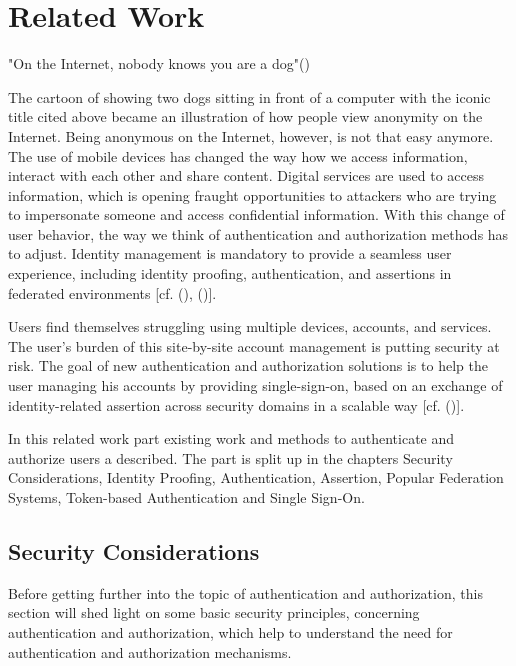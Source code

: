 \chapter{Related Work}\label{chap:authenticationandauthorization}

\chapterstart


"On the Internet, nobody knows you are a dog"(\cite{Steiner:Dog:1992})

The cartoon of \cite{Steiner:Dog:1992} showing two dogs sitting in front of a computer with the iconic title cited above became an illustration of how people view anonymity on the Internet. Being anonymous on the Internet, however, is not that easy anymore. The use of mobile devices has changed the way how we access information, interact with each other and share content. Digital services are used to access information, which is opening fraught opportunities to attackers who are trying to impersonate someone and access confidential information.  With this change of user behavior, the way we think of authentication and authorization methods has to adjust. Identity management is mandatory to provide a seamless user experience, including identity proofing, authentication, and assertions in federated environments [cf. (\cite{NIST:2017:DIG}), (\cite{Corre:2017:WHI})].


Users find themselves struggling using multiple devices, accounts, and services. The user's burden of this site-by-site account management is putting security at risk. The goal of new authentication and authorization solutions is to help the user managing his accounts by providing single-sign-on, based on an exchange of identity-related assertion across security domains in a scalable way [cf. (\cite{Corre:2017:WHI})].  

In this related work part existing work and methods to authenticate and authorize users a described. The part is split up in the chapters Security Considerations, Identity Proofing, Authentication, Assertion, Popular Federation Systems, Token-based Authentication and Single Sign-On.
  

\section{Security Considerations}

Before getting further into the topic of authentication and authorization, this section will shed light on some basic security principles, concerning authentication and authorization, which help to understand the need for authentication and authorization mechanisms. 

